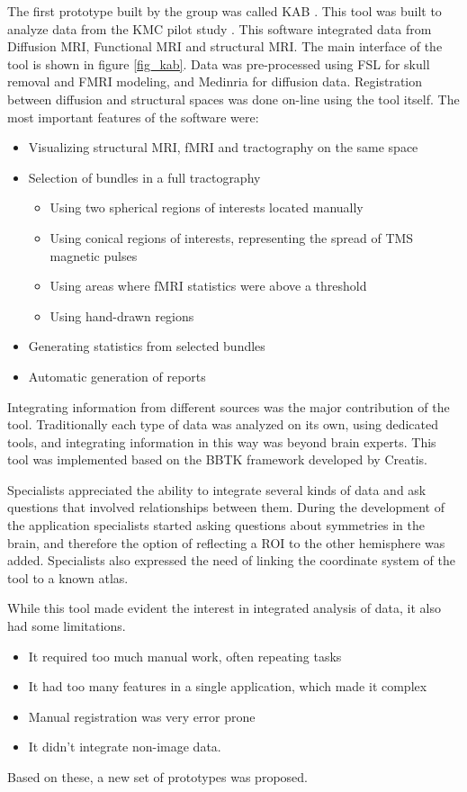 The first prototype built by the group was called KAB \autocite{castro_kab:_2012}. This tool was built to analyze data from the KMC pilot study \autocite{schneider_cerebral_2012}. This software integrated data from Diffusion MRI, Functional MRI and structural MRI. The main interface of the tool is shown in figure \ref{fig_kab}. Data was pre-processed using FSL \autocite{jenkinson_fsl_2012} for skull removal and FMRI modeling, and Medinria \autocite{toussaint_medinria:_2007} for diffusion data. Registration between diffusion and structural spaces was done on-line using the tool itself. The most important features of the software were:

\begin{itemize}
\item Visualizing structural MRI, fMRI and tractography on the same space
\item Selection of bundles in a full tractography
\begin{itemize}
\item Using two spherical regions of interests located manually
\item Using conical regions of interests, representing the spread of TMS magnetic pulses
\item Using areas where fMRI statistics were above a threshold
\item Using hand-drawn regions
\end{itemize}
\item Generating statistics from selected bundles
\item Automatic generation of reports
\end{itemize}

Integrating information from different sources was the major contribution of the tool. Traditionally each type of data was analyzed on its own, using dedicated tools, and integrating information in this way was beyond brain experts. This tool was implemented based on the BBTK framework \autocite{hoyos_creatools:_2012} developed by Creatis.

Specialists appreciated the ability to integrate several kinds of data and ask questions that involved relationships between them. During the development of the application specialists started asking questions about symmetries in the brain, and therefore the option of reflecting a ROI to the other hemisphere was added. Specialists also expressed the need of linking the coordinate system of the tool to a known atlas.

While this tool made evident the interest in integrated analysis of data, it also had some limitations.
\begin{itemize}
\item It required too much manual work, often repeating tasks
\item It had too many features in a single application, which made it complex
\item Manual registration was very error prone
\item It didn't integrate non-image data.
\end{itemize}
Based on these, a new set of prototypes was proposed.

